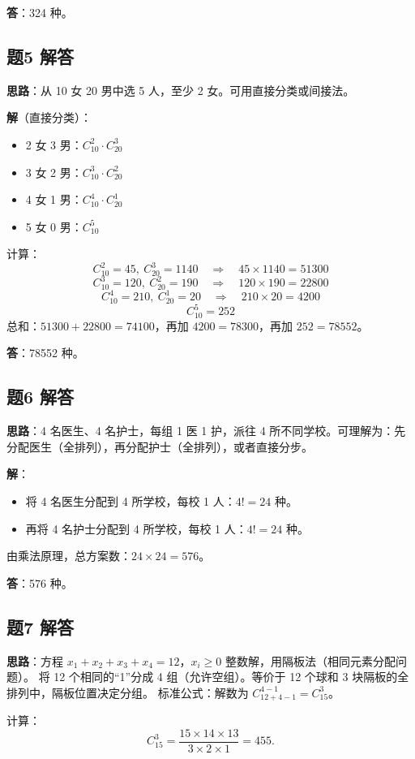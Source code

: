 \documentclass[10pt]{article}
\begin{document}
\textbf{答}：324 种。

\subsection*{题5 解答}
\textbf{思路}：从 10 女 20 男中选 5 人，至少 2 女。可用直接分类或间接法。

\textbf{解}（直接分类）：
\begin{itemize}
\item 2 女 3 男：\(C_{10}^2 \cdot C_{20}^3\)
\item 3 女 2 男：\(C_{10}^3 \cdot C_{20}^2\)
\item 4 女 1 男：\(C_{10}^4 \cdot C_{20}^1\)
\item 5 女 0 男：\(C_{10}^5\)
\end{itemize}
计算：
\[
C_{10}^2 = 45,\ C_{20}^3 = 1140 \quad \Rightarrow \quad 45 \times 1140 = 51300
\]
\[
C_{10}^3 = 120,\ C_{20}^2 = 190 \quad \Rightarrow \quad 120 \times 190 = 22800
\]
\[
C_{10}^4 = 210,\ C_{20}^1 = 20 \quad \Rightarrow \quad 210 \times 20 = 4200
\]
\[
C_{10}^5 = 252
\]
总和：\(51300 + 22800 = 74100\)，再加 \(4200 = 78300\)，再加 \(252 = 78552\)。

\textbf{答}：78552 种。

\subsection*{题6 解答}
\textbf{思路}：4 名医生、4 名护士，每组 1 医 1 护，派往 4 所不同学校。可理解为：先分配医生（全排列），再分配护士（全排列），或者直接分步。

\textbf{解}：
\begin{itemize}
\item 将 4 名医生分配到 4 所学校，每校 1 人：\(4! = 24\) 种。
\item 再将 4 名护士分配到 4 所学校，每校 1 人：\(4! = 24\) 种。
\end{itemize}
由乘法原理，总方案数：\(24 \times 24 = 576\)。

\textbf{答}：576 种。

\subsection*{题7 解答}
\textbf{思路}：方程 \(x_1+x_2+x_3+x_4=12\)，\(x_i \ge 0\) 整数解，用隔板法（相同元素分配问题）。
将 12 个相同的“1”分成 4 组（允许空组）。等价于 12 个球和 3 块隔板的全排列中，隔板位置决定分组。
标准公式：解数为 \(C_{12+4-1}^{4-1} = C_{15}^3\)。

计算：
\[
C_{15}^3 = \frac{15\times14\times13}{3\times2\times1} = 455.
\]
\end{document}
